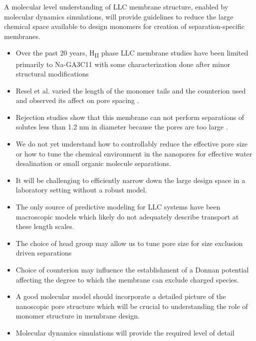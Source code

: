 \documentclass{article}
\begin{document}
  A molecular level understanding of LLC membrane structure, enabled by molecular
  dynamics simulations, will provide guidelines to reduce the large chemical space
  available to design monomers for creation of separation-specific membranes.
  \begin{itemize}
    \item Over the past 20 years, H\textsubscript{II} phase LLC membrane studies have been limited primarily
    to Na-GA3C11 with some characterization done after minor structural modifications
    \item Resel et al. varied the length of the monomer tails and the counterion used and 
    observed its affect on pore spacing \cite{resel_structural_2000}.
    \item Rejection studies show that this membrane can not perform separations of
    solutes less than 1.2 nm in diameter because the pores are too large \cite{zhou_supported_2005}.
    \item  We do not yet understand how to controllably reduce the effective pore size or 
    how to tune the chemical environment in the nanopores for effective water
    desalination or small organic molecule separations.
    \item It will be challenging to efficiently narrow down the large design space in 
    a laboratory setting without a robust model.
    \item The only source of predictive modeling for LLC systems have been macroscopic models 
    which likely do not adequately describe transport at these length scales. %
    \item The choice of head group may allow us to tune pore size for size exclusion driven separations
    \item Choice of counterion may influence the establishment of a Donnan potential
    affecting the degree to which the membrane can exclude charged species.
    \item A good molecular model should incorporate a detailed picture of the nanoscopic pore 
    structure which will be crucial to understanding the role of monomer structure in 
    membrane design.
    \item Molecular dynamics simulations will provide the required level of detail
  \end{itemize}
\end{document}
